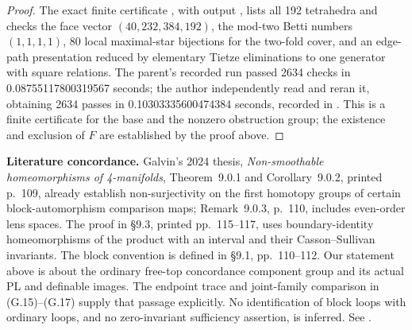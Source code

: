 \begin{proof}
The exact finite certificate
, with output
, lists all 192
tetrahedra and checks the face vector
$(40,232,384,192)$, the mod-two Betti numbers $(1,1,1,1)$,
80 local maximal-star bijections for the two-fold cover, and an
edge-path presentation reduced by elementary Tietze eliminations to
one generator with square relations. The parent's recorded run
passed 2634 checks in 0.08755117800319567 seconds; the author independently
read and reran it, obtaining 2634 passes in 0.10303335600474384 seconds,
recorded in
.
This is a finite
certificate for the base and the nonzero obstruction group; the
existence and exclusion of $F$ are established by the proof above.
\end{proof}

\textbf{Literature concordance.}
Galvin's 2024 thesis, \emph{Non-smoothable homeomorphisms of
4-manifolds}, Theorem~9.0.1 and Corollary~9.0.2, printed p.~109,
already establish non-surjectivity on the first homotopy groups of
certain block-automorphism comparison maps; Remark~9.0.3, p.~110,
includes even-order lens spaces. The proof in \S9.3, printed
pp.~115--117, uses boundary-identity homeomorphisms of the product
with an interval and their Casson--Sullivan invariants.
The block convention is defined in \S9.1, pp.~110--112.
Our statement above is about the ordinary free-top concordance
component group and its actual PL and definable images. The endpoint
trace and joint-family comparison in (G.15)--(G.17) supply that
passage explicitly. No identification of block loops with ordinary
loops, and no zero-invariant sufficiency assertion, is inferred.
See \cite[Theorem~9.0.1, Corollary~9.0.2, and \S9.3]{GalvinThesis2024}.
